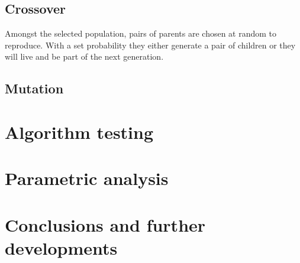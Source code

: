 \documentclass[twocolumn]{article}
\begin{document}
\subsection{Crossover}
Amongst the selected population, pairs of parents are chosen at random to reproduce. With a set probability they either generate a pair of children or they will live and be part of the next generation. 

\subsection{Mutation}


\section{Algorithm testing}

\section{Parametric analysis}

\section{Conclusions and further developments}
\end{document}
